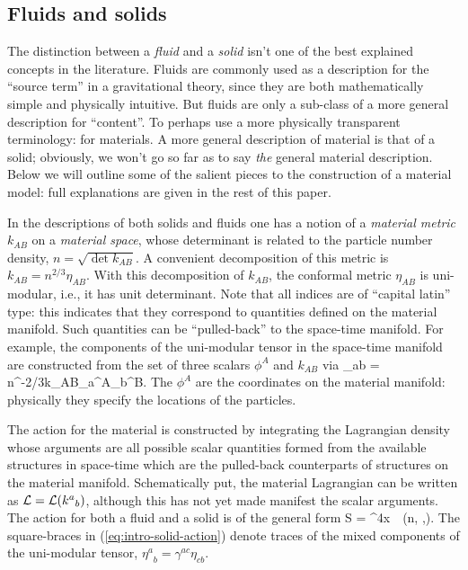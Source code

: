 \subsection{Fluids and solids}
The distinction between a \textit{fluid} and a \textit{solid} isn't one of the best explained concepts in the literature. Fluids are commonly used as a description for the ``source term'' in a gravitational theory, since they are both mathematically simple and physically intuitive. But fluids are only a sub-class of a more general description for ``content''. To perhaps use a  more physically transparent terminology: for materials. A more general  description of material is that of a solid; obviously, we won't go so far as to say \textit{the}  general material description. Below we will outline some of the salient pieces to the construction of a material model: full explanations are given in the rest of this paper.

In the descriptions of both solids and fluids  one has a notion of a \textit{material metric} $k_{AB}$ on a \textit{material space}, whose determinant is related to the particle number density, $n = \sqrt{\det k_{AB}}$. A convenient decomposition of this metric is $k_{AB} = n^{2/3}\eta_{AB}$. With this decomposition of   $k_{AB}$, the conformal metric $\eta_{AB}$ is uni-modular, i.e., it has unit determinant. Note that all indices are of ``capital latin'' type: this indicates that they correspond to quantities defined on the material manifold. Such quantities can be ``pulled-back'' to the space-time manifold. For example, the components of the uni-modular tensor in the space-time manifold are constructed from the set of three scalars $\phi^A$  and $k_{AB}$ via
\bea
\eta_{ab} = n^{-2/3}k_{AB}\partial_a\phi^A\partial_b\phi^B.
\eea
The $\phi^A$ are the coordinates on the material manifold: physically they specify the locations of the particles.

The action for the material is constructed by integrating the Lagrangian density whose arguments are all possible scalar quantities formed from the available structures in space-time which are the pulled-back counterparts of structures on the material manifold. Schematically put, the material Lagrangian can be written as $\mathcal{L} = \mathcal{L}({k^a}_b)$, although this has not yet made manifest the scalar arguments.
The action for both a fluid and a solid is of the general form 
\bea
\label{eq:intro-solid-action}
S = \int \dd^4x\, \, \ld\left(n, \left[ \gbm{\eta}\right],\left[\gbm{\eta}^2\right]\right).
\eea
The square-braces in (\ref{eq:intro-solid-action}) denote traces of the mixed components of the uni-modular tensor, ${\eta^a}_b = \gamma^{ac}\eta_{cb}$. 

